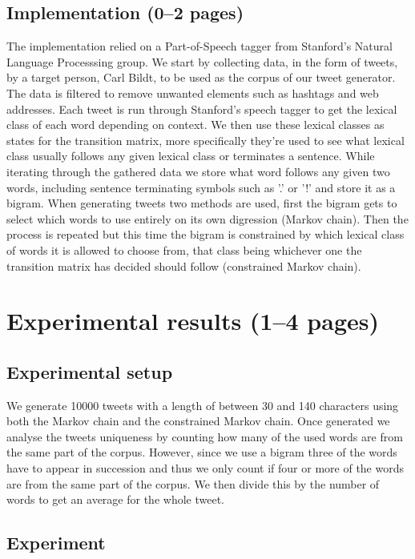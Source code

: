 \documentclass[a4paper,12pt]{article}
\begin{document}
\subsection{Implementation (0--2 pages)}
\label{sec:impl}
The implementation relied on a Part-of-Speech tagger from Stanford's Natural Language Processsing group.
We start by collecting data, in the form of tweets, by a target person, Carl Bildt, to be used as the corpus of our tweet generator. The data is filtered to remove unwanted elements such as hashtags and web addresses.
Each tweet is run through Stanford's speech tagger to get the lexical class of each word depending on context.
We then use these lexical classes as states for the transition matrix, more specifically they're used to see what lexical class usually follows any given lexical class or terminates a sentence.
While iterating through the gathered data we store what word follows any given two words, including sentence terminating symbols such as '.' or '!' and store it as a bigram.
When generating tweets two methods are used, first the bigram gets to select which words to use entirely on its own digression (Markov chain). Then the process is repeated but this time the bigram is constrained by which lexical class of words it is allowed to choose from, that class being whichever one the transition matrix has decided should follow (constrained Markov chain).
\section{Experimental results (1--4 pages)}
\label{sec:exps}
\subsection{Experimental setup}
We generate 10000 tweets with a length of between 30 and 140 characters using both the Markov chain and the constrained Markov chain.
Once generated we analyse the tweets uniqueness by counting how many of the used words are from the same part of the corpus. However, since we use a bigram three of the words have to appear in succession and thus we only count if four or more of the words are from the same part of the corpus. We then divide this by the number of words to get an average for the whole tweet.
\newpage
\subsection{Experiment}
\end{document}
